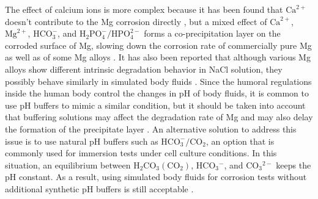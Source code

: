 The effect of calcium ions is more complex because it has been found that $\mathrm{Ca}^{2+}$ doesn't contribute to the Mg corrosion directly \cite{Willumeit-Roemer2019}, but a mixed effect of $\mathrm{Ca}^{2+}$, $\mathrm{Mg}^{2+}$, $\mathrm{HCO}_{3}^{-}$, and $\mathrm{H}_{2} \mathrm{PO}_{4}^{-} / \mathrm{HPO}_{4}^{2-}$ forms a co-precipitation layer on the corroded surface of Mg, slowing down the corrosion rate of commercially pure Mg as well as of some Mg alloys \cite{Mei2019,Lamaka2018}. It has also been reported that although various Mg alloys show different intrinsic degradation behavior in NaCl solution, they possibly behave similarly in simulated body fluids \cite{Agha2016,Mei2019a}. Since the humoral regulations inside the human body control the changes in pH of body fluids, it is common to use pH buffers to mimic a similar condition, but it should be taken into account that buffering solutions may affect the degradation rate of Mg \cite{Cui2017,Kannan2017} and may also delay the formation of the precipitate layer \cite{Lamaka2018}. An alternative solution to address this issue is to use natural pH buffers such as $\mathrm{HCO}_{3}^{-}/\mathrm{CO}_{2}$, an option that is commonly used for immersion tests under cell culture conditions. In this situation, an equilibrium between $\mathrm{H}_{2} \mathrm{CO}_{3}\left(\mathrm{CO}_{2}\right)$, $\mathrm{HCO}_{3}{ }^{-}$, and $\mathrm{CO}_{3}{ }^{2-}$ keeps the pH constant. As a result, using simulated body fluids for corrosion tests without additional synthetic pH buffers is still acceptable \cite{Lamaka2018,Mei2019a}.

